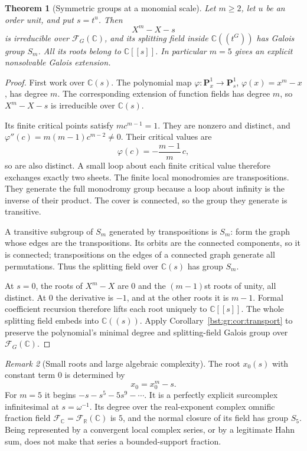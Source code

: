 \documentclass[11pt,letterpaper]{article}
\newtheorem{theorem}{Theorem}[section]
\theoremstyle{definition}
\theoremstyle{remark}
\newtheorem{remark}[theorem]{Remark}
\newcommand{\R}{\mathbb R}
\newcommand{\C}{\mathbb C}
\newcommand{\HH}[2]{#1((t^{#2}))}
\newcommand{\FF}[2]{\mathcal F_{#2}(#1)}
\begin{document}
\begin{theorem}[Symmetric groups at a monomial scale]\label{bst:gr:thm:symmetric}
Let $m\geq2$, let $u$ be an order unit, and put $s=t^u$. Then
\[
 X^m-X-s
\]
is irreducible over $\FF{\C}G$, and its splitting field inside $\HH{\C}G$
has Galois group $S_m$. All its roots belong to $\C[[s]]$. In particular
$m=5$ gives an explicit nonsolvable Galois extension.
\end{theorem}
\begin{proof}
First work over $\C(s)$. The polynomial map
$\varphi:\mathbf P^1_x\to\mathbf P^1_s$, $\varphi(x)=x^m-x$, has degree $m$.
The corresponding extension of function fields has degree $m$, so $X^m-X-s$
is irreducible over $\C(s)$.

Its finite critical points satisfy $mc^{m-1}=1$. They are nonzero and
distinct, and $\varphi''(c)=m(m-1)c^{m-2}\ne0$. Their critical values are
\[
 \varphi(c)=-\frac{m-1}{m}\,c,
\]
so are also distinct. A small loop about each finite critical value therefore
exchanges exactly two sheets. The finite local monodromies are
transpositions. They generate the full monodromy group because a loop about
infinity is the inverse of their product. The cover is connected, so the
group they generate is transitive.

A transitive subgroup of $S_m$ generated by transpositions is $S_m$: form the
graph whose edges are the transpositions. Its orbits are the connected
components, so it is connected; transpositions on the edges of a connected
graph generate all permutations. Thus the splitting field over $\C(s)$ has
group $S_m$.

At $s=0$, the roots of $X^m-X$ are $0$ and the $(m-1)$st roots of unity, all
distinct. At $0$ the derivative is $-1$, and at the other roots it is $m-1$.
Formal coefficient recursion therefore lifts each root uniquely to
$\C[[s]]$. The whole splitting field embeds into $\C((s))$. Apply
Corollary~\ref{bst:gr:cor:transport} to preserve the polynomial's minimal
degree and splitting-field Galois group over $\FF{\C}G$.
\end{proof}

\begin{remark}[Small roots and large algebraic complexity]\label{bst:gr:rem:smallroots}
The root $x_0(s)$ with constant term $0$ is determined by
\[
 x_0=x_0^m-s.
\]
For $m=5$ it begins $-s-s^5-5s^9-\cdots$. It is a perfectly explicit
surcomplex infinitesimal at $s=\omega^{-1}$. Its degree over the
real-exponent complex omnific fraction field $\mathscr F_\C=\FF{\C}{\R}$ is
$5$, and the normal closure of its field has group $S_5$. Being represented
by a convergent local complex series, or by a legitimate Hahn sum, does not
make that series a bounded-support fraction.
\end{remark}
\end{document}
